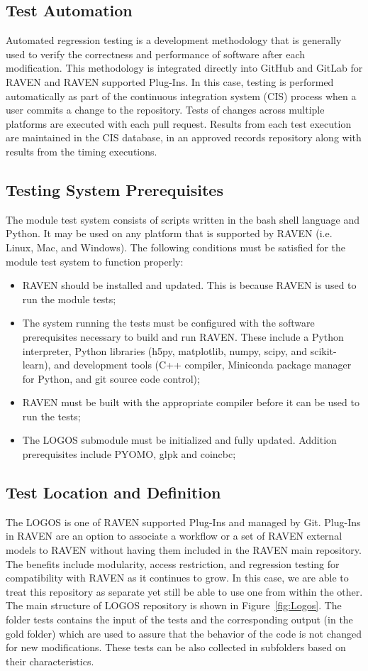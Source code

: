 \subsection{Test Automation}
Automated regression testing is a development methodology that is generally used
to verify the correctness and performance of software after each modification.
This methodology is integrated directly into GitHub and GitLab for RAVEN and RAVEN
supported Plug-Ins. In this case, testing is performed automatically as part of the
continuous integration system (CIS) process when a user commits a change to the
repository. Tests of changes across multiple platforms are executed with each pull
request. Results from each test execution are maintained in the CIS database, in
an approved records repository along with results from the timing executions.

\subsection{Testing System Prerequisites}
The module test system consists of scripts written in the bash shell language
and Python. It may be used on any platform that is supported by RAVEN (i.e.
Linux, Mac, and Windows). The following conditions must be satisfied for the
module test system to function properly:
\begin{itemize}
  \item RAVEN should be installed and updated. This is because RAVEN is used to
  run the module tests;
  \item The system running the tests must be configured with the software prerequisites
  necessary to build and run RAVEN. These include a Python interpreter, Python
  libraries (h5py, matplotlib, numpy, scipy, and scikit-learn), and development
  tools (C++ compiler, Miniconda package manager for Python, and git source code control);
  \item RAVEN must be built with the appropriate compiler before it can be used to
  run the tests;
  \item The LOGOS submodule must be initialized and fully updated. Addition prerequisites
  include PYOMO, glpk and coincbc;
\end{itemize}

\subsection{Test Location and Definition}
The LOGOS is one of RAVEN supported Plug-Ins and managed by Git. Plug-Ins in RAVEN
are an option to associate a workflow or a set of RAVEN external models to RAVEN
without having them included in the RAVEN main repository. The benefits include
modularity, access restriction, and regression testing for compatibility with RAVEN
as it continues to grow. In this case, we are able to treat this repository as
separate yet still be able to use one from within the other. The main structure
of LOGOS repository is shown in Figure~\ref{fig:Logos}. The folder tests contains the input of
the tests and the corresponding output (in the gold folder) which are used to
assure that the behavior of the code is not changed for new modifications. These
tests can be also collected in subfolders based on their characteristics.

